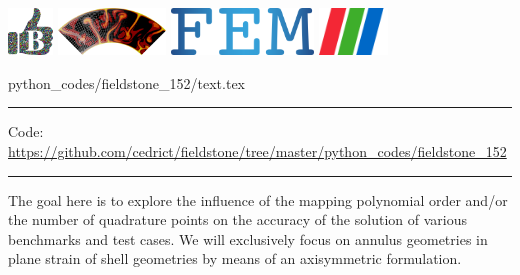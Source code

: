 \noindent
\includegraphics[height=1.25cm]{images/pictograms/benchmark}
\includegraphics[height=1.25cm]{images/pictograms/aspect_logo}
\includegraphics[height=1.25cm]{images/pictograms/FEM}
\includegraphics[height=1.25cm]{images/pictograms/paraview}



\begin{flushright} {\tiny {\color{gray} python\_codes/fieldstone\_152/text.tex}} \end{flushright}



\par\noindent\rule{\textwidth}{0.4pt}

\begin{center}
\inpython
{\small Code: \url{https://github.com/cedrict/fieldstone/tree/master/python_codes/fieldstone_152}}
\end{center}

\par\noindent\rule{\textwidth}{0.4pt}





The goal here is to explore the influence of the mapping polynomial order and/or
the number of quadrature points on the accuracy of the solution of various benchmarks and test cases.
We will exclusively focus on annulus geometries in plane strain of 
shell geometries by means of an axisymmetric formulation.

